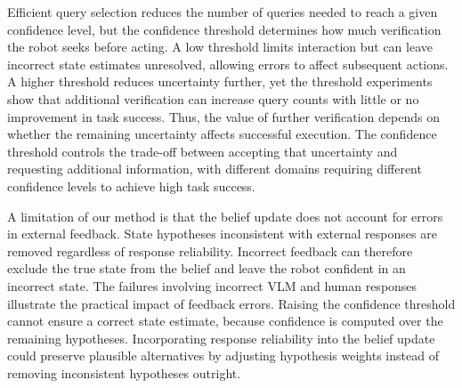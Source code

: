 Efficient query selection reduces the number of queries needed to reach a given confidence level, but the confidence threshold determines how much verification the robot seeks before acting. A low threshold limits interaction but can leave incorrect state estimates unresolved, allowing errors to affect subsequent actions. A higher threshold reduces uncertainty further, yet the threshold experiments show that additional verification can increase query counts with little or no improvement in task success. Thus, the value of further verification depends on whether the remaining uncertainty affects successful execution. The confidence threshold controls the trade-off between accepting that uncertainty and requesting additional information, with different domains requiring different confidence levels to achieve high task success.


A limitation of our method is that the belief update does not account for errors in external feedback. State hypotheses inconsistent with external responses are removed regardless of response reliability. Incorrect feedback can therefore exclude the true state from the belief and leave the robot confident in an incorrect state. The failures involving incorrect VLM and human responses illustrate the practical impact of feedback errors. Raising the confidence threshold cannot ensure a correct state estimate, because confidence is computed over the remaining hypotheses. Incorporating response reliability into the belief update could preserve plausible alternatives by adjusting hypothesis weights instead of removing inconsistent hypotheses outright.

